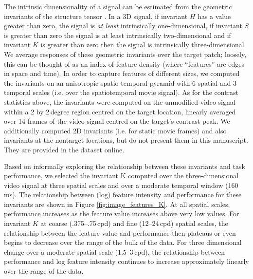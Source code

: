 \documentclass[11pt,a4paper]{article}
\begin{document}
The intrinsic dimensionality of a signal can be estimated from the geometric invariants of the structure tensor \citep{Zetzsche1990,Barth2000}.
In a 3D signal, if invariant $H$ has a value greater than zero, the signal is \textit{at least} intrinsically one-dimensional, if invariant $S$ is greater than zero the signal is at least intrinsically two-dimensional and if invariant $K$ is greater than zero then the signal is intrinsically three-dimensional.
We average responses of these geometric invariants over the target patch; loosely, this can be thought of as an index of feature density (where ``features'' are edges in space and time). 
In order to capture features of different sizes, we computed the invariants on an anisotropic spatio-temporal pyramid  with 6 spatial and 3 temporal scales (i.e. over the spatiotemporal movie signal).
As for the contrast statistics above, the invariants were computed on the unmodified video signal within a 2 by 2\,degree region centred on the target location, linearly averaged over 14 frames of the video signal centred on the target's contrast peak. 
We additionally computed 2D invariants (i.e. for static movie frames) and also invariants at the nontarget locations, but do not present them in this manuscript.
They are provided in the dataset online.

Based on informally exploring the relationship between these invariants and task performance, we selected the invariant K computed over the three-dimensional video signal at three spatial scales and over a moderate temporal window (160\,ms).
The relationship between (log) feature intensity and performance for these invariants are shown in Figure \ref{fig:image_features_K}.
At all spatial scales, performance increases as the feature value increases above very low values.
For invariant $K$ at coarse (.375--.75\,cpd) and fine (12--24\,cpd) spatial scales, the relationship between the feature value and performance then plateaus or even begins to decrease over the range of the bulk of the data.
For three dimensional change over a moderate spatial scale (1.5--3\,cpd), the relationship between performance and log feature intensity continues to increase approximately linearly over the range of the data.
\end{document}
